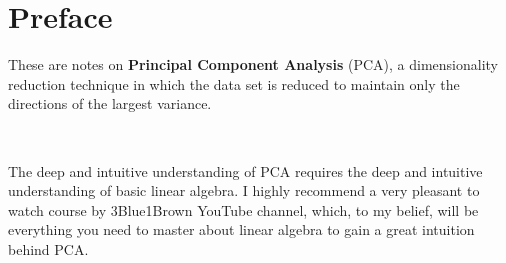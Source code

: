 \documentclass[10pt,twocolumn]{article}
\begin{document}



\vspace{10mm}

\setlength{\parindent}{0cm}

\fontsize{14}{10}\selectfont {Kamila Zdybał}

\vspace{2mm}

\fontsize{10}{10}

\vspace{2mm}

\fontsize{10}{10}

\section*{Preface}

These are notes on \textbf{Principal Component Analysis} (PCA), a dimensionality reduction technique in which the data set is reduced to maintain only the directions of the largest variance.

\,\,

The deep and intuitive understanding of PCA requires the deep and intuitive understanding of basic linear algebra. I highly recommend a very pleasant to watch course by 3Blue1Brown YouTube channel, which, to my belief, will be everything you need to master about linear algebra to gain a great intuition behind PCA.
\end{document}
